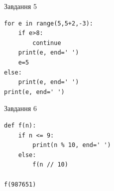 \documentclass[12pt, ukrainian]{article}
\begin{document}
{\vspace{15mm}
\begin{minipage}[t]{9.7cm}                
{\begin{center}Завдання {5}\end{center}}
\begin{verbatim}
for e in range(5,5+2,-3):
    if e>8:
        continue
    print(e, end=' ')
    e=5
else:
    print(e, end=' ')
print(e, end=' ')
\end{verbatim}     
\end{minipage}
\vline \hspace{8mm}
\begin{minipage}[t]{8.0cm}                
{\begin{center}Завдання {6}\end{center}}
\begin{verbatim}
def f(n):
    if n <= 9:
        print(n % 10, end=' ')
    else:
        f(n // 10)

f(987651)
\end{verbatim}     
\end{minipage}

}
\newpage
\end{document}
